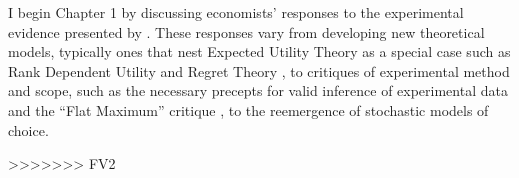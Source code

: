 \documentclass[../main.tex]{subfiles}
\begin{document}
I begin Chapter 1 by discussing economists' responses to the experimental evidence presented by \textcite{Grether1979}.
These responses vary from developing new theoretical models, typically ones that nest Expected Utility Theory as a special case such as Rank Dependent Utility \parencite{Quiggin1982} and Regret Theory \parencite{Bell1982, Loomes1982}, to critiques of experimental method and scope, such as the necessary precepts for valid inference of experimental data \parencite{Smith1982} and the \enquote{Flat Maximum} critique \parencite{Harrison1989, Harrison1992}, to the reemergence of stochastic models of choice.



>>>>>>> FV2

\onlyinsubfile{
\newpage
\printbibliography[segment=5, heading=subbibliography]
}
\end{document}
